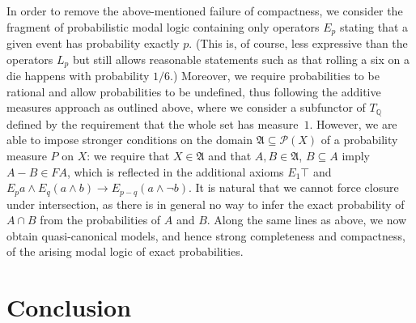 \documentclass[proceedings]{stacs}
\theoremstyle{definition}
\theoremstyle{plain}
\newcommand{\Pow}{\mathcal{P}}
\newcommand{\modimpl}{\to}
\newcommand{\FA}{\mathfrak{A}}
\begin{document}
\newcommand{\PMLe}{\mathrm{PML}_e}
\begin{exa}
In order to remove the above-mentioned failure of compactness, we
consider the fragment of probabilistic modal logic containing only
operators $E_p$ stating that a given event has probability exactly
$p$. (This is, of course, less expressive than the operators $L_p$ but
still allows reasonable statements such as that rolling a six on a die
happens with probability $1/6$.) Moreover, we require probabilities to
be rational and allow probabilities to be undefined, thus following
the additive measures approach as outlined above, where we consider a
subfunctor of $T_{\mathbb{Q}}$ defined by the requirement that the
whole set has measure~$1$. However, we are able to impose stronger
conditions on the domain $\FA\subseteq\Pow(X)$ of a probability
measure $P$ on $X$: we require that $X\in\FA$ and that $A,B\in\FA$,
$B\subseteq A$ imply $A-B\in FA$, which is reflected in the additional
axioms $E_1\top$ and $E_pa\land E_q(a\land b)\modimpl
E_{p-q}(a\land\neg b)$. It is natural that we cannot force closure
under intersection, as there is in general no way to infer the exact
probability of $A\cap B$ from the probabilities of $A$ and $B$.
Along the same lines as above, we now obtain quasi-canonical models,
and hence strong completeness and compactness, of the arising modal
logic of exact probabilities.

\end{exa}




\section{Conclusion}
\end{document}
